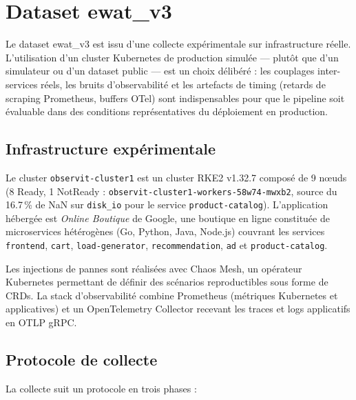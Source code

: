 
\section{Dataset ewat\_v3}
\label{sec:dataset}

Le dataset ewat\_v3 est issu d'une collecte expérimentale sur infrastructure réelle.
L'utilisation d'un cluster Kubernetes de production simulée --- plutôt que d'un simulateur
ou d'un dataset public --- est un choix délibéré : les couplages inter-services réels,
les bruits d'observabilité et les artefacts de timing (retards de scraping Prometheus,
buffers OTel) sont indispensables pour que le pipeline soit évaluable dans des conditions
représentatives du déploiement en production.

\subsection{Infrastructure expérimentale}
\label{sec:infra}

Le cluster \texttt{observit-cluster1} est un cluster RKE2 v1.32.7 composé de 9 nœuds
(8 Ready, 1 NotReady : \texttt{observit-cluster1-workers-58w74-mwxb2}, source du
16.7\,\% de NaN sur \texttt{disk\_io} pour le service \texttt{product-catalog}).
L'application hébergée est \emph{Online Boutique} de Google, une boutique en ligne
constituée de microservices hétérogènes (Go, Python, Java, Node.js) couvrant les services
\texttt{frontend}, \texttt{cart}, \texttt{load-generator}, \texttt{recommendation},
\texttt{ad} et \texttt{product-catalog}.

Les injections de pannes sont réalisées avec Chaos Mesh, un opérateur Kubernetes permettant
de définir des scénarios reproductibles sous forme de CRDs.
La stack d'observabilité combine Prometheus (métriques Kubernetes et applicatives) et un
OpenTelemetry Collector recevant les traces et logs applicatifs en OTLP gRPC.

\subsection{Protocole de collecte}
\label{sec:collect}

La collecte suit un protocole en trois phases :

